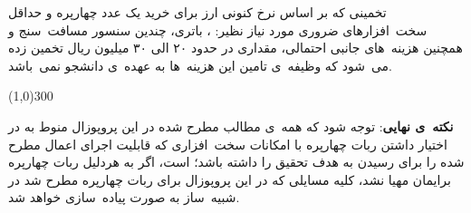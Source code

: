 تخمینی که بر اساس نرخ کنونی ارز برای خرید یک عدد چهارپره و حداقل سخت\ افزارهای ضروری مورد نیاز نظیر: ، باتری، چندین سنسور مسافت\ سنج و همچنین هزینه\ های جانبی احتمالی، مقداری در حدود ۲۰ الی ۳۰ میلیون ریال تخمین زده می\ شود که وظیفه\ ی تامین این هزینه\ ها به عهده\ ی دانشجو نمی\ باشد.
\vspace{3em}
\begin{center}\color{lightgray}
\line(1,0){300}
\end{center}
\vspace{3em}
\textbf{\large نکته\ ی نهایی}:
توجه شود که همه\ ی مطالب مطرح شده در این پروپوزال منوط به در اختیار داشتن ربات چهارپره با امکانات سخت\ افزاری که قابلیت اجرای اعمال مطرح شده را برای رسیدن به هدف تحقیق را داشته باشد؛ است، اگر به هردلیل ربات چهارپره برایمان مهیا نشد، کلیه مسایلی که در این پروپوزال برای ربات چهارپره مطرح شد در شبیه\ ساز به صورت  پیاده\ سازی خواهد شد.